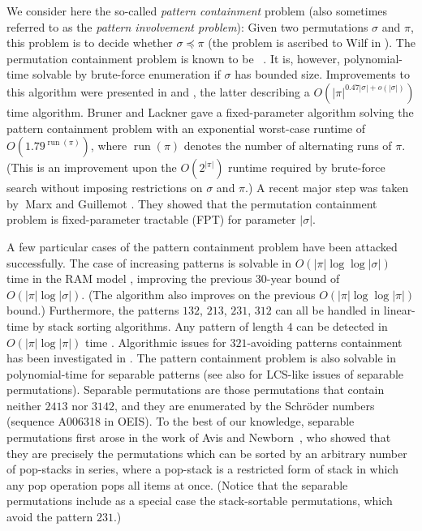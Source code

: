 \documentclass[a4paper]{llncs}
\DeclareMathOperator{\RUN}{run}
\newcounter{num}
\begin{document}
	We consider here the so-called \emph{pattern containment} problem
	(also sometimes referred to as the \emph{pattern involvement problem}):
	Given two permutations $\sigma$ and $\pi$, this problem is to decide whether
	$\sigma \preceq \pi$ (the problem is ascribed to Wilf in \cite{Bose:Buss:Lubiw:1998}).
	The permutation containment problem is known to be \NPhard~\cite{Bose:Buss:Lubiw:1998}.
	It is, however, polynomial-time solvable by brute-force enumeration
	if $\sigma$ has bounded size.
	Improvements to this algorithm were presented in
	\cite{Albert:Aldred:Atkinson:Holton:ISAAC:2001} and
	\cite{Ahal:Rabinovich:2008},
	the latter describing a $O(|\pi|^{0.47|\sigma|+o(|\sigma|)})$ time algorithm.
	Bruner and Lackner \cite{Bruner:Lackner:SWAT:2012}
	gave a fixed-parameter algorithm solving the pattern containment problem with
	an exponential worst-case runtime of $O(1.79^{\RUN(\pi)})$,
	where $\RUN(\pi)$ denotes the number of alternating runs of $\pi$.
	(This is an improvement upon the $O(2^{|\pi|})$ runtime required by
	brute-force search without imposing restrictions on $\sigma$ and $\pi$.)
	A recent major step was taken by􏰂 Marx and Guillemot
	\cite{Guillemot:Marx:SODA:2014}.
	They showed that
	the permutation containment problem is fixed-parameter tractable (FPT) for
	parameter $|\sigma|$.

	A few particular cases of the pattern containment problem have been attacked successfully.
	The case of increasing patterns is solvable in
	$O(|\pi| \log \log |\sigma|)$ time in the RAM model \cite{Crochemore:Porat:2010},
	improving the previous 30-year bound of $O(|\pi| \log |\sigma|)$.
	(The algorithm also improves on the previous
	$O(|\pi| \log \log |\pi|)$ bound.)
	Furthermore, the patterns $132$, $213$, $231$, $312$ can all be handled in linear-time
	by stack sorting algorithms.
	Any pattern of length $4$ can be detected in $O(|\pi| \log |\pi|)$ time
	\cite{Albert:Aldred:Atkinson:Holton:ISAAC:2001}.
	Algorithmic issues for $321$-avoiding patterns containment has been investigated in
	\cite{Guillemot:Vialette:ISAAC:2009}.
	The pattern containment problem is also solvable in
	polynomial-time for separable patterns \cite{Ibarra:1997,Bose:Buss:Lubiw:1998}
	(see also \cite{Bouvel:Rossin:Vialette:CPM:2007} for LCS-like issues
	of separable permutations).
	Separable permutations are those permutations that contain neither
	$2413$ nor $3142$, and they are enumerated by the Schr{\"o}der numbers
	(sequence A006318 in OEIS).
	To the best of our knowledge,
	separable permutations first arose in the work of
	Avis and Newborn~\cite{Avis:Newborn:1981},
	who showed that they are precisely the permutations which can be sorted by an
	arbitrary number of pop-stacks in series,
	where a pop-stack is a restricted form of stack in which any pop operation
	pops all items at once.
	(Notice that the separable permutations include as a special case the
	stack-sortable permutations, which avoid the pattern $231$.)
\end{document}
